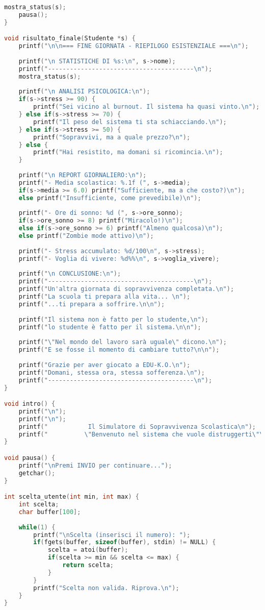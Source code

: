 \documentclass[a4paper,12pt]{article}
\begin{document}
\begin{lstlisting}[language=C, caption=Codice completo (file Capolavoro2.c)]
    mostra_status(s);
    pausa();
}

void risultato_finale(Studente *s) {
    printf("\n\n=== FINE GIORNATA - RIEPILOGO ESISTENZIALE ===\n");
    
    printf("\n STATISTICHE DI %s:\n", s->nome);
    printf("----------------------------------------\n");
    mostra_status(s);
    
    printf("\n ANALISI PSICOLOGICA:\n");
    if(s->stress >= 90) {
        printf("Sei vicino al burnout. Il sistema ha quasi vinto.\n");
    } else if(s->stress >= 70) {
        printf("Il peso del sistema ti sta schiacciando.\n");
    } else if(s->stress >= 50) {
        printf("Sopravvivi, ma a quale prezzo?\n");
    } else {
        printf("Hai resistito, ma domani si ricomincia.\n");
    }
    
    printf("\n REPORT GIORNALIERO:\n");
    printf("- Media scolastica: %.1f (", s->media);
    if(s->media >= 6.0) printf("Sufficiente, ma a che costo?)\n");
    else printf("Insufficiente, come prevedibile)\n");
    
    printf("- Ore di sonno: %d (", s->ore_sonno);
    if(s->ore_sonno >= 8) printf("Miracolo!)\n");
    else if(s->ore_sonno >= 6) printf("Almeno qualcosa)\n");
    else printf("Zombie mode attivo)\n");
    
    printf("- Stress accumulato: %d/100\n", s->stress);
    printf("- Voglia di vivere: %d%%\n", s->voglia_vivere);
    
    printf("\n CONCLUSIONE:\n");
    printf("----------------------------------------\n");
    printf("Un'altra giornata di sopravvivenza completata.\n");
    printf("La scuola ti prepara alla vita... \n");
    printf("...ti prepara a soffrire.\n\n");
    
    printf("Il sistema non è fatto per lo studente,\n");
    printf("lo studente è fatto per il sistema.\n\n");
    
    printf("\"Nel mondo del lavoro sarà uguale\" dicono.\n");
    printf("E se fosse il momento di cambiare tutto?\n\n");
    
    printf("Grazie per aver giocato a EDU-K.O.\n");
    printf("Domani, stessa ora, stessa sofferenza.\n");
    printf("----------------------------------------\n");
}

void intro() {
    printf("\n");
    printf("\n");
    printf("           Il Simulatore di Sopravvivenza Scolastica\n");
    printf("          \"Benvenuto nel sistema che vuole distruggerti\"\n");
}

void pausa() {
    printf("\nPremi INVIO per continuare...");
    getchar();
}

int scelta_utente(int min, int max) {
    int scelta;
    char buffer[100];
    
    while(1) {
        printf("\nScelta (inserisci il numero): ");
        if(fgets(buffer, sizeof(buffer), stdin) != NULL) {
            scelta = atoi(buffer);
            if(scelta >= min && scelta <= max) {
                return scelta;
            }
        }
        printf("Scelta non valida. Riprova.\n");
    }
}
\end{lstlisting}
\end{document}
